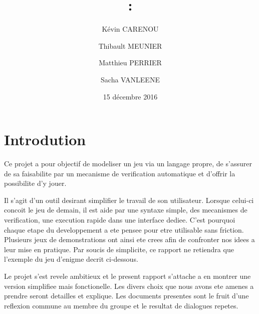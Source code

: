 \documentclass[12pt]{article}
\title{\Matiere:\\ \titre}
\author{Kévin CARENOU \and Thibault MEUNIER \and Matthieu PERRIER \and Sacha VANLEENE}
\date{15 décembre 2016}
\begin{document}
\maketitle

\setcounter{page}{0}
\thispagestyle{empty} %

\newpage

\section*{Introdution}
Ce projet a pour objectif de modeliser un jeu via un langage propre, de s'assurer de sa faisabilite par un mecanisme de verification automatique et d'offrir la possibilite d'y jouer. 
\newline

Il s'agit d'un outil desirant simplifier le travail de son utilisateur. Lorsque celui-ci concoit le jeu de demain, il est aide par une syntaxe simple, des mecanismes de verification, une execution rapide dans une interface dediee. C'est pourquoi  chaque etape du developpement a ete pensee pour etre utilisable sans friction.
\newline
Plusieurs jeux de demonstrations ont ainsi ete crees afin de confronter nos idees a leur mise en pratique. Par soucis de simplicite, ce rapport ne retiendra que l'exemple du jeu d'enigme decrit ci-dessous.
\newline

Le projet s'est revele ambitieux et le present rapport s'attache a en montrer une version simplifiee mais fonctionelle. Les divers choix que nous avons ete amenes a prendre seront detailles et explique. Les documents presentes sont le fruit d'une reflexion commune au membre du groupe et le resultat de dialogues repetes.
\newpage
\end{document}
